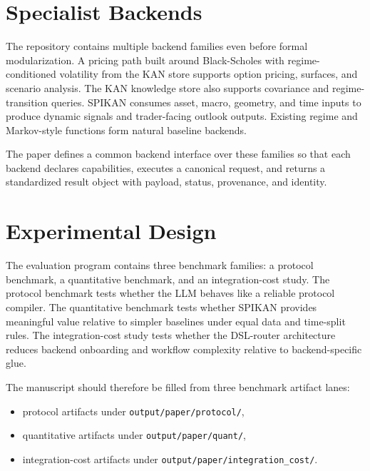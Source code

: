 \documentclass[11pt]{article}
\begin{document}
\section{Specialist Backends}

The repository contains multiple backend families even before formal
modularization. A pricing path built around Black-Scholes with regime-conditioned
volatility from the KAN store supports option pricing, surfaces, and scenario
analysis. The KAN knowledge store also supports covariance and regime-transition
queries. SPIKAN consumes asset, macro, geometry, and time inputs to produce
dynamic signals and trader-facing outlook outputs. Existing regime and
Markov-style functions form natural baseline backends.

The paper defines a common backend interface over these families so that each
backend declares capabilities, executes a canonical request, and returns a
standardized result object with payload, status, provenance, and identity.

\section{Experimental Design}

The evaluation program contains three benchmark families: a protocol benchmark,
a quantitative benchmark, and an integration-cost study. The protocol benchmark
tests whether the LLM behaves like a reliable protocol compiler. The
quantitative benchmark tests whether SPIKAN provides meaningful value relative
to simpler baselines under equal data and time-split rules. The integration-cost
study tests whether the DSL-router architecture reduces backend onboarding and
workflow complexity relative to backend-specific glue.

The manuscript should therefore be filled from three benchmark artifact lanes:
\begin{itemize}[leftmargin=*]
  \item protocol artifacts under \texttt{output/paper/protocol/},
  \item quantitative artifacts under \texttt{output/paper/quant/},
  \item integration-cost artifacts under \texttt{output/paper/integration\_cost/}.
\end{itemize}
\end{document}

